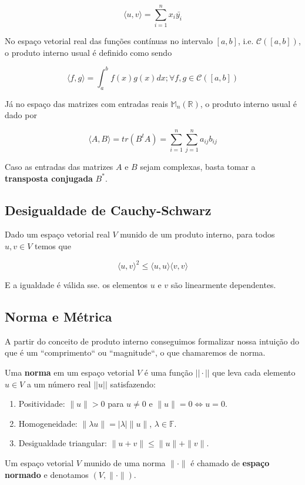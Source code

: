 \documentclass[12pt,a4paper]{article}
\begin{document}
\[
\langle u, v \rangle = \sum_{i=1}^n x_i \bar{y_i}
\]

No espaço vetorial real das funções contínuas no intervalo $[a,b]$, i.e. $\mathcal{C}([a,b])$, o produto interno usual é definido como sendo

\[
\langle f, g \rangle = \int_a^b f(x)g(x)dx; \forall f, g \in \mathcal{C}([a,b])
\]

Já no espaço das matrizes com entradas reais $\mathbb{M}_n(\mathbb{R})$, o produto interno usual é dado por

\[
\langle A, B \rangle = tr(B^t A) = \sum_{i=1}^n \sum_{j=1}^n a_{ij}b_{ij}
\]

Caso as entradas das matrizes $A$ e $B$ sejam complexas, basta tomar a \textbf{transposta conjugada} $B^{\ast}$.

\subsection{Desigualdade de Cauchy-Schwarz}

Dado um espaço vetorial real $V$ munido de um produto interno, para todos $u, v \in V$ temos que

\[
\langle u, v \rangle ^2 \leq \langle u, u \rangle \langle v, v \rangle
\]

E a igualdade é válida sse. os elementos $u$ e $v$ são linearmente dependentes.

\subsection{Norma e Métrica}

A partir do conceito de produto interno conseguimos formalizar nossa intuição do que é um ``comprimento`` ou ``magnitude``, o que chamaremos de norma.

Uma \textbf{norma} em um espaço vetorial $V$ é uma função $|| \cdot ||$ que leva cada elemento $u \in V$  a um número real $|| u ||$ satisfazendo:

\begin{enumerate}
\item Positividade: $\| u \|> 0$ para $u \neq 0$ e $\|u \|=0 \iff u = 0$.
\item Homogeneidade: $\| \lambda u \| = |\lambda | \| u \|$, $\lambda \in \mathbb{F}$.
\item Desigualdade triangular: $\| u + v \| \leq \| u \| + \| v \|$.
\end{enumerate}

Um espaço vetorial $V$ munido de uma norma $\| \cdot \|$ é chamado de \textbf{espaço normado} e denotamos $(V, \| \cdot \|)$.
\end{document}

